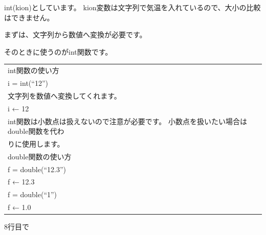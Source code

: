 \documentclass[text08.tex]{subfiles}
\begin{document}
int(kion)としています。
kion変数は文字列で気温を入れているので、大小の比較はできません。

まずは、文字列から数値へ変換が必要です。

そのときに使うのがint関数です。











\begin{table}[htbp]
    \centering
    \begin{tabular}{|l|}
        \hline
        int関数の使い方\\
        i = int(“12”)\\
        文字列を数値へ変換してくれます。\\
        i ← 12 \\
        int関数は小数点は扱えないので注意が必要です。
	    小数点を扱いたい場合はdouble関数を代わ\\
      りに使用します。\\
        double関数の使い方\\
        f = double(“12.3”)\\
        f ← 12.3\\
        f = double(“1”)\\
        f ← 1.0\\
        \hline
    \end{tabular}
\end{table}



\bigskip

8行目で
\end{document}
